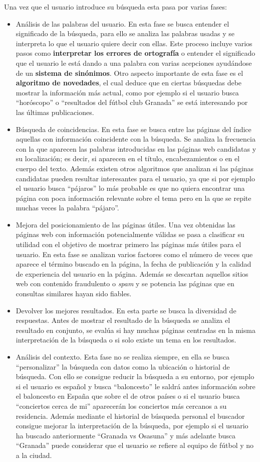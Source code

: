 \documentclass[size=a4, parskip=half, titlepage=false, toc=flat, toc=bib, 12pt]{scrartcl}
\theoremstyle{theorem-style}
\theoremstyle{definition-style}
\theoremstyle{remark-style}
\theoremstyle{example-style}
\theoremstyle{definition-style}
\theoremstyle{remark-style}
\begin{document}
Una vez que el usuario introduce su búsqueda esta pasa por varias fases:
\begin{itemize}
\item Análisis de las palabras del usuario. En esta fase se busca entender el significado de la búsqueda, para ello se analiza las palabras usadas y se interpreta lo que el usuario quiere decir con ellas. Este proceso incluye varios pasos como \textbf{interpretar los errores de ortografía} o entender el significado que el usuario le está dando a una palabra con varias acepciones ayudándose de un \textbf{sistema de sinónimos}. Otro aspecto importante de esta fase es el \textbf{algoritmo de novedades}, el cual deduce que en ciertas búsquedas debe mostrar la información más actual, como por ejemplo si el usuario busca ``horóscopo'' o ``resultados del fútbol club Granada'' se está interesando por las últimas publicaciones.
\item Búsqueda de coincidencias. En esta fase se busca entre las páginas del índice aquellas con información coincidente con la búsqueda. Se analiza la frecuencia con la que aparecen las palabras introducidas en las páginas web candidatas y su localización; es decir, si aparecen en el título, encabezamientos o en el cuerpo del texto. Además existen otros algoritmos que analizan si las páginas candidatas pueden resultar interesantes para el usuario, ya que si por ejemplo el usuario busca ``pájaros'' lo más probable es que no quiera encontrar una página con poca información relevante sobre el tema pero en la que se repite muchas veces la palabra ``pájaro''.
\item Mejora del posicionamiento de las páginas útiles. Una vez obtenidas las páginas web con información potencialmente válidas se pasa a clasificar su utilidad con el objetivo de mostrar primero las páginas más útiles para el usuario. En esta fase se analizan varios factores como el número de veces que aparece el término buscado en la página, la fecha de publicación y la calidad de experiencia del usuario en la página. Además se descartan aquellos sitios web con contenido fraudulento o \textit{spam} y se potencia las páginas que en consultas similares hayan sido fiables.
\item Devolver los mejores resultados. En esta parte se busca la diversidad de respuestas. Antes de mostrar el resultado de la búsqueda se analiza el resultado en conjunto, se evalúa si hay muchas páginas centradas en la misma interpretación de la búsqueda o si solo existe un tema en los resultados.
\item Análisis del contexto. Esta fase no se realiza siempre, en ella se busca ``personalizar'' la búsqueda con datos como la ubicación o historial de búsqueda. Con ello se consigue reducir la búsqueda a su entorno, por ejemplo si el usuario es español y busca ``baloncesto'' le saldrá antes información sobre el baloncesto en España que sobre el de otros países o si el usuario busca ``conciertos cerca de mi'' aparecerán los conciertos más cercanos a su residencia. Además mediante el historial de búsqueda personal el buscador consigue mejorar la interpretación de la búsqueda, por ejemplo si el usuario ha buscado anteriormente ``Granada vs Osasuna'' y más adelante busca ``Granada'' puede considerar que el usuario se refiere al equipo de fútbol y no a la ciudad.

\end{itemize}
\end{document}
